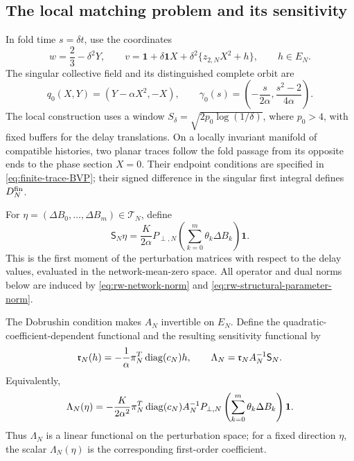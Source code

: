\subsection{The local matching problem and its sensitivity}

In fold time \(s=\delta t\), use the coordinates
\begin{equation}
 w=\frac23-\delta^2Y,\qquad
 v=\mathbf1+\delta\mathbf1X+
       \delta^2\{z_{2,N}X^2+h\},\qquad h\in E_N.
 \label{eq:rw-fold-coordinates}
\end{equation}
The singular collective field and its distinguished complete orbit are
\begin{equation}
 q_0(X,Y)=(Y-\alpha X^2,-X),\qquad
 \gamma_0(s)=\left(-\frac{s}{2\alpha},\frac{s^2-2}{4\alpha}\right).
 \label{eq:rw-singular-canard}
\end{equation}
The local construction uses a window
\(S_\delta=\sqrt{2p_0\log(1/\delta)}\), where \(p_0>4\), with fixed
buffers for the delay translations.  On a locally invariant manifold of
compatible histories, two planar traces follow the fold passage from its
opposite ends to the phase section \(X=0\).  Their endpoint conditions are
specified in \cref{eq:finite-trace-BVP}; their signed difference in the
singular first integral defines \(D_N^{\rm fin}\).

For \(\eta=(\Delta B_0,\ldots,\Delta B_m)\in\mathcal T_N\), define
\begin{equation}
 \mathsf S_N\eta
 =\frac{K}{2\alpha}P_{\perp,N}
    \left(\sum_{k=0}^m\theta_k\Delta B_k\right)\mathbf1.
 \label{eq:rw-transverse-source}
\end{equation}
This is the first moment of the perturbation matrices with respect to the
delay values, evaluated in the network-mean-zero space.
All operator and dual norms below are induced by
\eqref{eq:rw-network-norm} and \eqref{eq:rw-structural-parameter-norm}.

The Dobrushin condition makes \(A_N\) invertible on \(E_N\).
Define the quadratic-coefficient-dependent functional
and the resulting sensitivity functional by
\begin{equation}
 \mathfrak r_N(h)=-\frac1\alpha\pi_N^T\operatorname{diag}(c_N)h,
 \qquad
 \Lambda_N=\mathfrak r_NA_N^{-1}\mathsf S_N.
 \label{eq:rw-return-functional-definition}
\end{equation}
Equivalently,
\begin{equation}
 \Lambda_N(\eta)
 =-\frac{K}{2\alpha^2}\pi_N^T\operatorname{diag}(c_N)A_N^{-1}P_{\perp,N}
   \left(\sum_{k=0}^m\theta_k\Delta B_k\right)\mathbf1.
 \label{eq:rw-return-functional}
\end{equation}
Thus \(\Lambda_N\) is a linear functional on the perturbation space; for a
fixed direction \(\eta\), the scalar \(\Lambda_N(\eta)\) is the corresponding
first-order coefficient.

